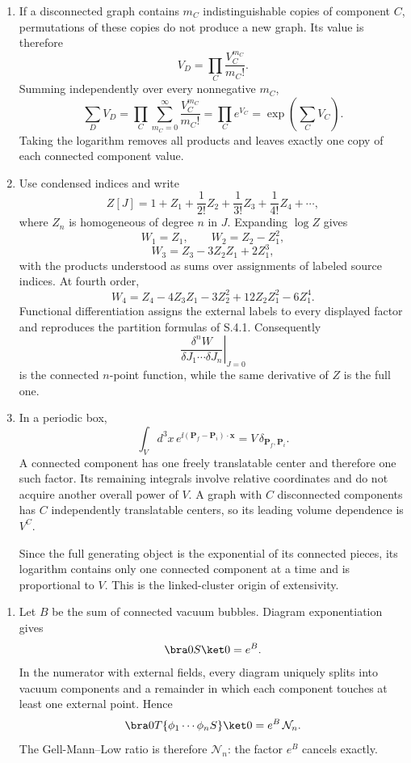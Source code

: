 \begin{enumerate}
\begin{enumerate}
\item
If a disconnected graph contains \(m_C\) indistinguishable copies of
component \(C\), permutations of these copies do not produce a new graph.
Its value is therefore
\[
 V_D=\prod_C\frac{V_C^{m_C}}{m_C!}.
\]
Summing independently over every nonnegative \(m_C\),
\[
 \sum_DV_D
 =\prod_C\sum_{m_C=0}^\infty\frac{V_C^{m_C}}{m_C!}
 =\prod_Ce^{V_C}
 =\exp\!\left(\sum_CV_C\right).
\]
Taking the logarithm removes all products and leaves exactly one copy of
each connected component value.
\item
Use condensed indices and write
\[
 Z[J]=1+Z_1+\frac1{2!}Z_2+\frac1{3!}Z_3+\frac1{4!}Z_4+\cdots,
\]
where \(Z_n\) is homogeneous of degree \(n\) in \(J\).  Expanding
\(\log Z\) gives
\[
 W_1=Z_1,\qquad
 W_2=Z_2-Z_1^2,
\]
\[
 W_3=Z_3-3Z_2Z_1+2Z_1^3,
\]
with the products understood as sums over assignments of labeled source
indices.  At fourth order,
\[
 W_4=Z_4-4Z_3Z_1-3Z_2^2+12Z_2Z_1^2-6Z_1^4.
\]
Functional differentiation assigns the external labels to every
displayed factor and reproduces the partition formulas of S.4.1.
Consequently
\[
 \left.\frac{\delta^nW}{\delta J_1\cdots\delta J_n}\right|_{J=0}
\]
is the connected \(n\)-point function, while the same derivative of
\(Z\) is the full one.
\item
In a periodic box,
\[
 \int_Vd^3x\,e^{\ii(\mathbf P_f-\mathbf P_i)\cdot\mathbf x}
 =V\,\delta_{\mathbf P_f,\mathbf P_i}.
\]
A connected component has one freely translatable center and therefore
one such factor.  Its remaining integrals involve relative coordinates
and do not acquire another overall power of \(V\).  A graph with \(C\)
disconnected components has \(C\) independently translatable centers,
so its leading volume dependence is \(V^C\).

Since the full generating object is the exponential of its connected
pieces, its logarithm contains only one connected component at a time and
is proportional to \(V\).  This is the linked-cluster origin of
extensivity.
\end{enumerate}

\begin{enumerate}
\item
Let \(B\) be the sum of connected vacuum bubbles.  Diagram
exponentiation gives
\[
 \bra0S\ket0=e^B.
\]
In the numerator with external fields, every diagram uniquely splits
into vacuum components and a remainder in which each component touches
at least one external point.  Hence
\[
 \bra0T\{\phi_1\cdots\phi_nS\}\ket0
 =e^B\,\mathcal N_n.
\]
The Gell-Mann--Low ratio is therefore \(\mathcal N_n\): the factor \(e^B\)
cancels exactly.


\end{enumerate}
\end{enumerate}
